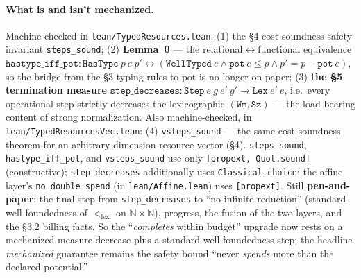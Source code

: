 \documentclass[11pt]{article}
\theoremstyle{plain}
\newcommand{\pot}{\mathrm{pot}}
\begin{document}
\paragraph{What is and isn't mechanized.}
Machine-checked in \texttt{lean/TypedResources.lean}: (1) the \S4 cost-soundness safety invariant
\texttt{steps\_sound}; (2) \textbf{Lemma~0} --- the relational$\leftrightarrow$functional
equivalence
$\texttt{hastype\_iff\_pot} : \texttt{HasType}\ p\ e\ p' \leftrightarrow
(\texttt{WellTyped}\ e \wedge \texttt{pot}\ e \le p \wedge p' = p - \texttt{pot}\ e)$,
so the bridge from the \S3 typing rules to $\pot$ is no longer on paper; (3) \textbf{the \S5
termination measure} $\texttt{step\_decreases} : \texttt{Step}\ e\ g\ e'\ g' \to
\texttt{Lex}\ e'\ e$, i.e.\ every operational step strictly decreases the lexicographic
$(\texttt{Wm}, \texttt{Sz})$ --- the load-bearing content of strong normalization.
Also machine-checked, in \texttt{lean/TypedResourcesVec.lean}: (4) \texttt{vsteps\_sound} --- the
same cost-soundness theorem for an arbitrary-dimension resource vector (\S4). \texttt{steps\_sound},
\texttt{hastype\_iff\_pot}, and \texttt{vsteps\_sound} use only \texttt{[propext, Quot.sound]}
(constructive); \texttt{step\_decreases} additionally uses \texttt{Classical.choice}; the affine
layer's \texttt{no\_double\_spend} (in \texttt{lean/Affine.lean}) uses \texttt{[propext]}. Still
\textbf{pen-and-paper}: the final step from \texttt{step\_decreases} to ``no infinite reduction''
(standard well-foundedness of $<_{\mathrm{lex}}$ on $\mathbb{N} \times \mathbb{N}$), progress, the
fusion of the two layers, and the \S3.2 billing facts. So the
``\emph{completes} within budget'' upgrade now rests on a mechanized measure-decrease plus a
standard well-foundedness step; the headline \emph{mechanized} guarantee remains the safety bound
``never \emph{spends} more than the declared potential.''
\end{document}
